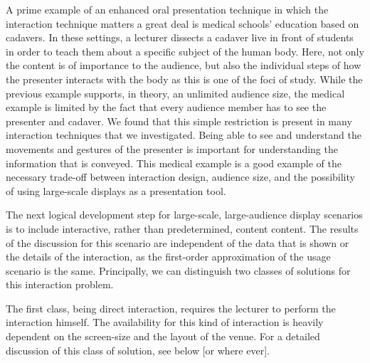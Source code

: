 \documentclass[review,journal]{vgtc}         %
\begin{document}
A prime example of an enhanced oral presentation technique in which the interaction technique matters a great deal is medical schools' education based on cadavers.
In these settings, a lecturer dissects a cadaver live in front of students in order to teach them about a specific subject of the human body.
Here, not only the content is of importance to the audience, but also the individual steps of how the presenter interacts with the body as this is one of the foci of study.
While the previous example supports, in theory, an unlimited audience size, the medical example is limited by the fact that every audience member has to see the presenter and cadaver.
We found that this simple restriction is present in many interaction techniques that we investigated.
Being able to see and understand the movements and gestures of the presenter is important for understanding the information that is conveyed.
This medical example is a good example of the necessary trade-off between interaction design, audience size, and the possibility of using large-scale displays as a presentation tool.

The next logical development step for large-scale, large-audience display scenarios is to include interactive, rather than predetermined, content content.
The results of the discussion for this scenario are independent of the data that is shown or the details of the interaction, as the first-order approximation of the usage scenario is the same.
Principally, we can distinguish two classes of solutions for this interaction problem.

The first class, being direct interaction, requires the lecturer to perform the interaction himself.
The availability for this kind of interaction is heavily dependent on the screen-size and the layout of the venue.
For a detailed discussion of this class of solution, see below [or where ever].
\end{document}
